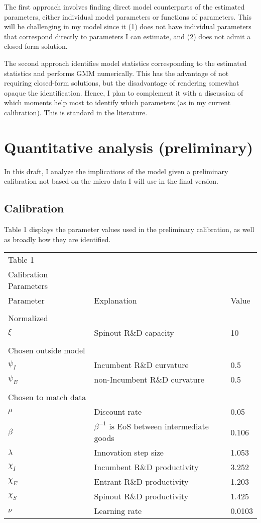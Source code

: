 \documentclass[11pt,english]{article}
\theoremstyle{remark}
\begin{document}
The first approach involves finding direct model counterparts of the estimated parameters, either individual model parameters or functions of parameters. This will be challenging in my model since it (1) does not have individual parameters that correspond directly to parameters I can estimate, and (2) does not admit a closed form solution.

The second approach identifies model statistics corresponding to the estimated statistics and performs GMM numerically. This has the advantage of not requiring closed-form solutions, but the disadvantage of rendering somewhat opaque the identification. Hence, I plan to complement it with a discussion of which moments help most to identify which parameters (as in my current calibration). This is standard in the literature.

\section{Quantitative analysis (preliminary)}\label{quantitative_analysis}

In this draft, I analyze the implications of the model given a preliminary calibration not based on the micro-data I will use in the final version.

\subsection{Calibration}

Table 1 displays the parameter values used in the preliminary calibration, as well as broadly how they are identified.

\begin{table}[h]
	\centering{}%
	\begin{tabular}{lll}
		Table 1 &  &  \tabularnewline
		Calibration Parameters &  &  \tabularnewline
		\hline 
		Parameter & Explanation & Value\tabularnewline
		\tabularnewline
		\hline 
		Normalized & & \tabularnewline
		$\xi$ & Spinout R\&D capacity & 10 \tabularnewline
		&  & \tabularnewline
		Chosen outside model & & \tabularnewline
		$\psi_I$ & Incumbent R\&D curvature & 0.5\tabularnewline
		$\psi_E$ & non-Incumbent R\&D curvature & 0.5\tabularnewline
		&  & \tabularnewline
		Chosen to match data & & \tabularnewline
		$\rho$ & Discount rate & 0.05\tabularnewline
		$\beta$ & $\beta^{-1}$ is EoS between intermediate goods & 0.106\tabularnewline
		$\lambda$ & Innovation step size & 1.053\tabularnewline
		$\chi_I$ & Incumbent R\&D productivity & 3.252\tabularnewline
		$\chi_E$ & Entrant R\&D productivity & 1.203\tabularnewline
		$\chi_S$ & Spinout R\&D productivity & 1.425\tabularnewline
		$\nu$ & Learning rate & 0.0103
	\end{tabular}
\end{table}
\end{document}

